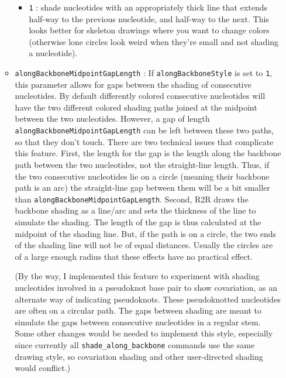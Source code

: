 \documentclass[letterpaper,12pt]{report}
\begin{document}
\begin{itemize}
\begin{itemize}
\begin{itemize}
		\item {\tt 1} : shade nucleotides with an appropriately thick line that extends half-way to the previous nucleotide, and half-way to the next.  This looks better for skeleton drawings where you want to change colors (otherwise lone circles look weird when they're small and not shading a nucleotide).
		\end{itemize}
	\item {\tt alongBackboneMidpointGapLength} : If {\tt alongBackboneStyle} is set to {\tt 1}, this parameter allows for gaps between the shading of consecutive nucleotides.  By default differently colored consecutive nucleotides will have the two different colored shading paths joined at the midpoint between the two nucleotides.  However, a gap of length {\tt alongBackboneMidpointGapLength} can be left between these two paths, so that they don't touch.  There are two technical issues that complicate this feature.  First, the length for the gap is the length along the backbone path between the two nucleotides, not the straight-line length.  Thus, if the two consecutive nucleotides lie on a circle (meaning their backbone path is an arc) the straight-line gap between them will be a bit smaller than {\tt alongBackboneMidpointGapLength}.  Second, R2R draws the backbone shading as a line/arc and sets the thickness of the line to simulate the shading.  The length of the gap is thus calculated at the midpoint of the shading line.  But, if the path is on a circle, the two ends of the shading line will not be of equal distances.  Usually the circles are of a large enough radius that these effects have no practical effect.

(By the way, I implemented this feature to experiment with shading nucleotides involved in a pseudoknot base pair to show covariation, as an alternate way of indicating pseudoknots.  These pseudoknotted nucleotides are often on a circular path.  The gaps between shading are meant to simulate the gaps between consecutive nucleotides in a regular stem.  Some other changes would be needed to implement this style, especially since currently all {\tt shade\_along\_backbone} commands use the same drawing style, so covariation shading and other user-directed shading would conflict.)


\end{itemize}
\end{itemize}
\end{document}

